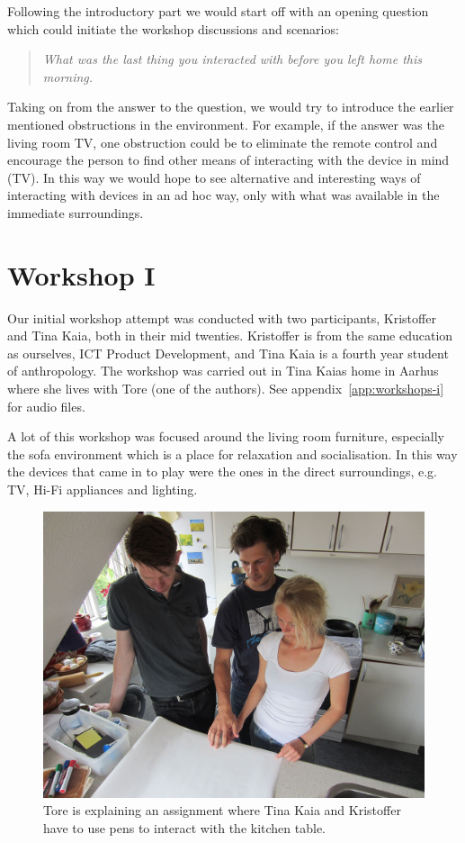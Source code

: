 Following the introductory part we would start off with an opening question which could initiate the workshop discussions and scenarios:

\begin{quotation}
  \emph{What was the last thing you interacted with before you left home this morning.}
\end{quotation}

Taking on from the answer to the question, we would try to introduce the earlier mentioned obstructions in the environment.
For example, if the answer was the living room TV, one obstruction could be to eliminate the remote control and encourage the person to find other means of interacting with the device in mind (TV).
In this way we would hope to see alternative and interesting ways of interacting with devices in an ad hoc way, only with what was available in the immediate surroundings.


\section{Workshop I}
\label{ch:workshops:workshop-i}
Our initial workshop attempt was conducted with two participants, Kristoffer and Tina Kaia, both in their mid twenties.
Kristoffer is from the same education as ourselves, ICT Product Development, and Tina Kaia is a fourth year student of anthropology.
The workshop was carried out in Tina Kaias home in Aarhus where she lives with Tore (one of the authors).
See appendix~\ref{app:workshops-i} for  audio files.

A lot of this workshop was focused around the living room furniture, especially the sofa environment which is a place for relaxation and socialisation.
In this way the devices that came in to play were the ones in the direct surroundings, e.g. TV, Hi-Fi appliances and lighting.

\begin{figure}[h]
  \centering
  \includegraphics[width=.9\textwidth]{figures/kaia_moos1}
  \caption{Tore is explaining an assignment where Tina Kaia and Kristoffer have to use pens to interact with the kitchen table.}
   \label{kaia_moos1}
\end{figure}

